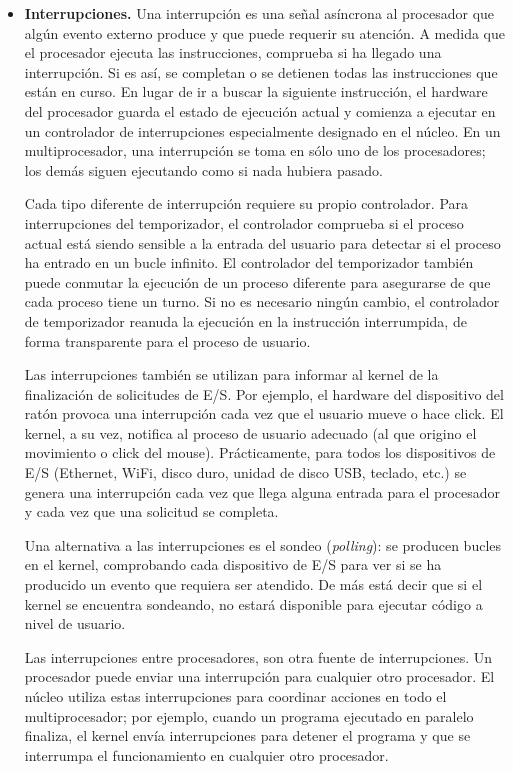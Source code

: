 \documentclass[10pt]{book}
\begin{document}
\begin{itemize}
\item \textbf{Interrupciones.} Una interrupción es una señal asíncrona al procesador que algún evento externo produce y que puede requerir su atención. A medida que el procesador ejecuta las instrucciones, comprueba si ha llegado una interrupción. Si es así, se completan o se detienen todas las instrucciones que están en curso. En lugar de ir a buscar la siguiente instrucción, el hardware del procesador guarda el estado de ejecución actual y comienza a ejecutar en un controlador de interrupciones especialmente designado en el núcleo. En un multiprocesador, una interrupción se toma en sólo uno de los procesadores; los demás siguen ejecutando como si nada hubiera pasado.

Cada tipo diferente de interrupción requiere su propio controlador. Para interrupciones del temporizador, el controlador comprueba si el proceso actual está siendo sensible a la entrada del usuario para detectar si el proceso ha entrado en un bucle infinito. El controlador del temporizador también puede conmutar la ejecución de un proceso diferente para asegurarse de que cada proceso tiene un turno. Si no es necesario ningún cambio, el controlador de temporizador reanuda la ejecución en la instrucción interrumpida, de forma transparente para el proceso de usuario.

Las interrupciones también se utilizan para informar al kernel de la finalización de solicitudes de E/S. Por ejemplo, el hardware del dispositivo del ratón provoca una interrupción cada vez que el usuario mueve o hace click. El kernel, a su vez, notifica al proceso de usuario adecuado (al que origino el movimiento o click del mouse). Prácticamente, para todos los dispositivos de E/S (Ethernet, WiFi, disco duro, unidad de disco USB, teclado, etc.) se genera una interrupción cada vez que llega alguna entrada para el procesador y cada vez que una solicitud se completa.

Una alternativa a las interrupciones es el sondeo (\textit{polling}): se producen bucles en el kernel, comprobando cada dispositivo de E/S para ver si se ha producido un evento que requiera ser atendido. De más está decir que si el kernel se encuentra sondeando, no estará disponible para ejecutar código a nivel de usuario.

Las interrupciones entre procesadores, son otra fuente de interrupciones. Un procesador puede enviar una interrupción para cualquier otro procesador. El núcleo utiliza estas interrupciones para coordinar acciones en todo el multiprocesador; por ejemplo, cuando un programa ejecutado en paralelo finaliza, el kernel envía interrupciones para detener el programa y que se interrumpa el funcionamiento en cualquier otro procesador.


\end{itemize}
\end{document}
